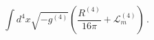 \begin{equation}
\int d^4 x \sqrt{-g^{(4)}} \left(\frac{R^{(4)}}{16 \pi} +
\mathcal{L}^{(4)}_m
\right)\, .
\end{equation}


